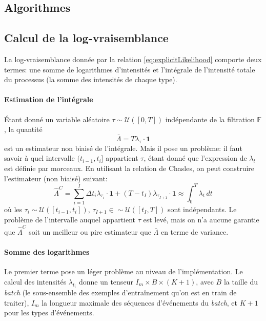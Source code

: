 \documentclass[11pt]{article}
\begin{document}
\printbibliography

\begin{appendices}
\section{Algorithmes}\label{sec:algoAppendix}

\subsection*{Calcul de la log-vraisemblance}

La log-vraisemblance donnée par la relation \eqref{eq:explicitLikelihood} comporte deux termes: une somme de logarithmes d'intensités et l'intégrale de l'intensité totale du processus (la somme des intensités de chaque type).

\paragraph{Estimation de l'intégrale} Étant donné un variable aléatoire $\tau\sim\mathcal{U}([0,T])$ indépendante de la filtration $\mathds{F}$, la quantité 
\[
\bar{\Lambda} = T\lambda_\tau\cdot\mathbf 1
\]
est un estimateur non biaisé de l'intégrale. Mais il pose un problème: il faut savoir à quel intervalle $(t_{i-1}, t_i]$ appartient $\tau$, étant donné que l'expression de $\lambda_t$ est définie par morceaux. En utilisant la relation de Chasles, on peut construire l'estimateur (non biaisé) suivant:
\begin{equation}
\hat{\Lambda}^C = \sum_{i=1}^{I} \Delta t_i\lambda_{\tau_i} \cdot \mathbf{1} + (T-t_{I})\lambda_{\tau_{I+1}}\cdot\mathbf{1}
\approx
\int_0^T \lambda_t\,dt
\end{equation}
où les $\tau_i\sim\mathcal{U}([t_{i-1}, t_i])$, $\tau_{I+1}\in\sim\mathcal{U}([t_I, T])$ sont indépendants. Le problème de l'intervalle auquel appartient $\tau$ est levé, mais on n'a aucune garantie que $\hat{\Lambda}^C$ soit un meilleur ou pire estimateur que $\bar{\Lambda}$ en terme de variance.

\paragraph{Somme des logarithmes} Le premier terme pose un léger problème au niveau de l'implémentation. Le calcul des intensités $\lambda_{t_i}$ donne un tenseur $I_m\times B\times (K+1)$, avec $B$ la taille du \textit{batch} (le sous-ensemble des exemples d'entraînement qu'on est en train de traiter), $I_m$ la longueur maximale des séquences d'événements du \textit{batch}, et $K+1$ pour les types d'événements.

\end{appendices}
\end{document}
